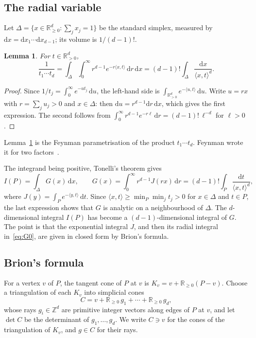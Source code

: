 \documentclass[11pt]{article}
\newtheorem{lemma}[theorem]{Lemma}
\theoremstyle{remark}
\newcommand{\R}{\mathbb{R}}
\newcommand{\Z}{\mathbb{Z}}
\newcommand{\scal}[2]{\langle #1, #2\rangle}
\newcommand{\dd}{\mathrm{d}}
\begin{document}
\subsection{The radial variable}

Let $\Delta = \{ x \in \R_{\geq 0}^d : \sum_j x_j = 1 \}$ be the standard
simplex, measured by $\dd x = \dd x_1 \cdots \dd x_{d-1}$; its volume is
$1/(d-1)!$.

\begin{lemma}\label{lem:radial0}
For $t \in \R_{>0}^d$,
\[
  \frac{1}{t_1 \cdots t_d}
  = \int_\Delta \int_0^\infty r^{d-1} e^{-r \scal{x}{t}} \, \dd r \, \dd x
  = (d-1)! \int_\Delta \frac{\dd x}{\scal{x}{t}^{d}}.
\]
\end{lemma}

\begin{proof}
Since $1/t_j = \int_0^\infty e^{-u t_j} \, \dd u$, the left-hand side is
$\int_{\R_{>0}^d} e^{-\scal{u}{t}} \, \dd u$. Write $u = r x$ with $r =
\sum_j u_j > 0$ and $x \in \Delta$: then $\dd u = r^{d-1} \dd r \, \dd x$,
which gives the first expression. The second follows from $\int_0^\infty
r^{d-1} e^{-r\ell} \, \dd r = (d-1)! \, \ell^{-d}$ for $\ell > 0$.
\end{proof}

Lemma~\ref{lem:radial0} is the Feynman parametrisation of the product $t_1
\cdots t_d$. Feynman wrote it for two factors~\cite[Appendix,
(14a)]{Feynman}.

The integrand being positive, Tonelli's theorem gives
\begin{equation}\label{eq:G0}
  I(P) = \int_\Delta G(x) \, \dd x,
  \qquad
  G(x) = \int_0^\infty r^{d-1} J(r x) \, \dd r
  = (d-1)! \int_P \frac{\dd t}{\scal{x}{t}^{d}},
\end{equation}
where $J(y) = \int_P e^{-\scal{y}{t}} \, \dd t$. Since $\scal{x}{t} \geq
\min_P \min_j t_j > 0$ for $x \in \Delta$ and $t \in P$, the last expression
shows that $G$ is analytic on a neighbourhood of $\Delta$. The
$d$-dimensional integral $I(P)$ has become a $(d-1)$-dimensional integral of
$G$. The point is that the exponential integral $J$, and then its radial
integral in~\eqref{eq:G0}, are given in closed form by Brion's formula.

\subsection{Brion's formula}

For a vertex $v$ of $P$, the tangent cone of $P$ at $v$ is $K_v = v +
\R_{\geq 0}(P - v)$. Choose a triangulation of each $K_v$ into simplicial
cones
\[
  C = v + \R_{\geq 0} \, g_1 + \cdots + \R_{\geq 0} \, g_d,
\]
whose rays $g_i \in \Z^d$ are primitive integer vectors along edges of $P$
at $v$, and let $\det C$ be the determinant of $g_1, \ldots, g_d$. We write
$C \ni v$ for the cones of the triangulation of $K_v$, and $g \in C$ for
their rays.
\end{document}
